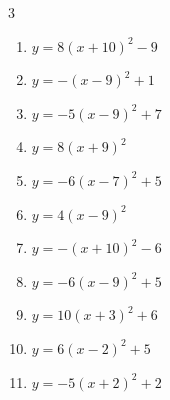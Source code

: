 \begin{multicols}{3}
\begin{enumerate}
        \phantom{$\displaystyle 頂点\left( -8 , 2 \right)$}

  \item $\displaystyle y=8\left( x+10\right)^{2}-9$

        \phantom{$\displaystyle 頂点\left( -10 , -9 \right)$}

  \item $\displaystyle y=-\left( x-9\right)^{2}+1$

        \phantom{$\displaystyle 頂点\left( 9 , 1 \right)$}

  \item $\displaystyle y=-5\left( x-9\right)^{2}+7$

        \phantom{$\displaystyle 頂点\left( 9 , 7 \right)$}

  \item $\displaystyle y=8\left( x+9\right)^{2}$

        \phantom{$\displaystyle 頂点\left( -9 , 0 \right)$}

  \item $\displaystyle y=-6\left( x-7\right)^{2}+5$

        \phantom{$\displaystyle 頂点\left( 7 , 5 \right)$}

  \item $\displaystyle y=4\left( x-9\right)^{2}$

        \phantom{$\displaystyle 頂点\left( 9 , 0 \right)$}

  \item $\displaystyle y=-\left( x+10\right)^{2}-6$

        \phantom{$\displaystyle 頂点\left( -10 , -6 \right)$}

  \item $\displaystyle y=-6\left( x-9\right)^{2}+5$

        \phantom{$\displaystyle 頂点\left( 9 , 5 \right)$}

  \item $\displaystyle y=10\left( x+3\right)^{2}+6$

        \phantom{$\displaystyle 頂点\left( -3 , 6 \right)$}

\columnbreak %

\resetques

  \item $\displaystyle y=6\left( x-2\right)^{2}+5$

        \phantom{$\displaystyle 頂点\left( 2 , 5 \right)$}

  \item $\displaystyle y=-5\left( x+2\right)^{2}+2$


\end{enumerate}
\end{multicols}
